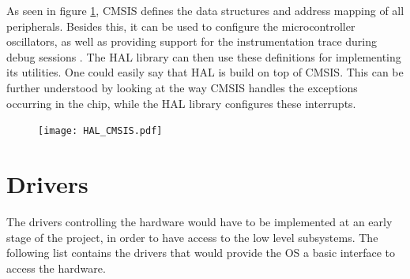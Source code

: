 As seen in figure \ref{fig:CMSIS_HAL}, CMSIS
defines the data structures and address mapping of all peripherals.
Besides this, it can be used to configure the microcontroller
oscillators, as well as providing support for the instrumentation trace during debug sessions \cite{cmsis_reference}.
The HAL library can then use these definitions for implementing its
utilities. One could easily say that HAL is build on top of CMSIS.
This can be further understood by looking at the way CMSIS handles
the exceptions occurring in the chip, while the HAL library configures
these interrupts.

 
\begin{figure}[H]
\centering
\texttt{[image: HAL\_CMSIS.pdf]}
\label{fig:CMSIS_HAL}
\end{figure}

\section{Drivers}

The drivers controlling the hardware would have to be implemented at an 
early stage of the project, in order to have access to the low level
subsystems.
The following list contains the drivers that would provide the OS a basic
interface to access the hardware.

